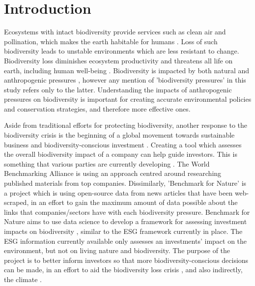 \documentclass[11pt, a4paper, titlepage]{article}
\begin{document}
	\newpage
	\tableofcontents
	
	\newpage
	
    \section*{Introduction}
    	
   	 Ecosystems with intact biodiversity provide services such as clean air and pollination, which makes the earth habitable for humans \citep{leemans2003millennium}. Loss of such biodiversity leads to unstable environments which are less resistant to change. Biodiversity loss diminishes ecosystem productivity \citep{duffy2017biodiversity} and threatens all life on earth, including human well-being \citep{diaz2006biodiversity}. Biodiversity is impacted by both natural and anthropogenic pressures \citep{nobel2020anthropogenic}, however any mention of 'biodiversity pressures' in this study refers only to the latter. Understanding the impacts of anthropogenic pressures on biodiversity is important for creating accurate environmental policies and conservation strategies, and therefore more effective ones. \newline
   	 
   	 Aside from traditional efforts for protecting biodiversity, another response to the biodiversity crisis \citep{ogar2020science} is the beginning of a global movement towards sustainable business and biodiversity-conscious investment \citep{pri2020}\citep{worldeconomicforum2020}\citep{wwf2020}. Creating a tool which assesses the overall biodiversity impact of a company can help guide investors. This is something that various parties are currently developing \citep{worldbenchmarkingalliance_2022}\citep{iccs_2020}. The World Benchmarking Alliance is using an approach centred around researching published materials from top companies. Dissimilarly, 'Benchmark for Nature' is a project which is using open-source data from news articles that have been web-scraped, in an effort to gain the maximum amount of data possible about the links that companies/sectors have with each biodiversity pressure. Benchmark for Nature aims to use data science to develop a framework for assessing investment impacts on biodiversity \citep{iccs_2020}, similar to the ESG framework currently in place. The ESG information currently available only assesses an investments' impact on the environment, but not on living nature and biodiversity. The purpose of the project is to better inform investors so that more biodiversity-conscious decisions can be made, in an effort to aid the biodiversity loss crisis \citep{gasu2021review}, and also indirectly, the climate \citep{shin2022actions}.\newline
   	 
\end{document}
